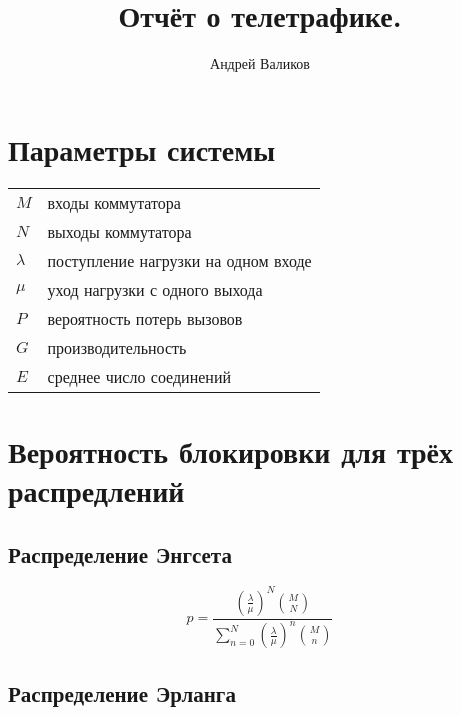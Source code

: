 \documentclass[12pt]{article}
\begin{document}
\title{Отчёт о телетрафике.}
\author{Андрей Валиков}
\date{}
\maketitle

\section{Параметры системы}\label{sec:systemParams}

\begin{tabular}{l l}
    $M$ & входы коммутатора \\
    $N$ & выходы коммутатора \\
    $\lambda$ & поступление нагрузки на одном входе \\
    $\mu$ & уход нагрузки с одного выхода \\
    $P$ & вероятность потерь вызовов \\
    $G$ & производительность \\
    $E$ & среднее число соединений \\
\end{tabular}
																																																							

\section{Вероятность блокировки для трёх распредлений}\label{sec:prob}

\subsection{Распределение Энгсета}\label{subsec:engset}

 \[
     p = \frac{\left(\frac{\lambda}{\mu}\right) ^ N \binom{M}{N}}
     {\sum_{n=0}^{N} \left(\frac{\lambda}{\mu}\right) ^ n \binom{M}{n}}
 \]

\subsection{Распределение Эрланга}\label{subsec:erlang}

\[

\]


%
%
%
%
%
%
%
\end{document}
